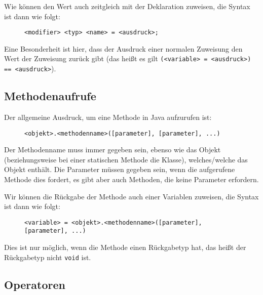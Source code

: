 	Wie können den Wert auch zeitgleich mit der Deklaration zuweisen, die Syntax ist dann wie folgt:
	\begin{figure}[H]
		\centering
		\lstinline|<modifier> <typ> <name> = <ausdruck>;|
	\end{figure}

	Eine Besonderheit ist hier, dass der Ausdruck einer normalen Zuweisung den Wert der Zuweisung zurück gibt (das heißt es gilt \texttt{(<variable> = <ausdruck>) == <ausdruck>}).

\subsection{Methodenaufrufe}
	
	Der allgemeine Ausdruck, um eine Methode in Java aufzurufen ist:
	\begin{figure}[H]
		\centering
		\lstinline|<objekt>.<methodenname>([parameter], [parameter], ...)|
	\end{figure}
	Der Methodenname muss immer gegeben sein, ebenso wie das Objekt (beziehungsweise bei einer statischen Methode die Klasse), welches/welche das Objekt enthält. Die Parameter müssen gegeben sein, wenn die aufgerufene Methode dies fordert, es gibt aber auch Methoden, die keine Parameter erfordern.
	
	Wir können die Rückgabe der Methode auch einer Variablen zuweisen, die Syntax ist dann wie folgt:
	\begin{figure}[H]
		\centering
		\lstinline|<variable> = <objekt>.<methodenname>([parameter], [parameter], ...)|
	\end{figure}
	Dies ist nur möglich, wenn die Methode einen Rückgabetyp hat, das heißt der Rückgabetyp nicht \lstinline|void| ist.

\subsection{Operatoren}
	
